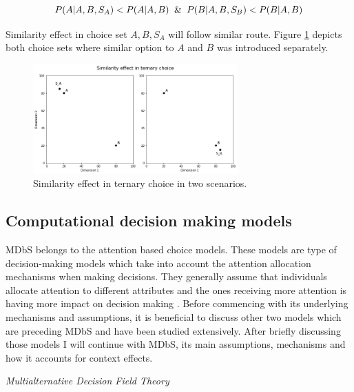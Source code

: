 \documentclass[a4paper,12pt]{article}
\begin{document}
\begin{equation}\label{eq:similarityProbability}
    P(A|A,B,S_A) < P(A|A,B) \And  P(B|A,B,S_B) < P(B|A,B)
\end{equation}

Similarity effect in choice set ${A, B, S_A}$ will follow similar route. Figure \ref{fig:similarityEffect} depicts both choice sets where similar option to $A$ and $B$ was introduced separately.


\begin{figure}[h]
    \centering
    \includegraphics[width=0.7\textwidth]{staticFiles/SimilarityEffect.png}
    \caption{Similarity effect in ternary choice in two scenarios.} %
    \label{fig:similarityEffect} %

\end{figure}


\subsection{Computational decision making models}

MDbS belongs to the attention based choice models. These models are type of decision-making models which take into account the attention allocation mechanisms when making decisions. They generally assume that individuals allocate attention to different attributes and the ones receiving more attention is having more impact on decision making \citep{gabaix2000boundedly}. Before commencing with its underlying mechanisms and assumptions, it is beneficial to discuss other two models which are preceding MDbS and have been studied extensively. After briefly discussing those models I will continue with MDbS, its main assumptions, mechanisms and how it accounts for context effects.

\textit{Multialternative Decision Field Theory}
\end{document}
